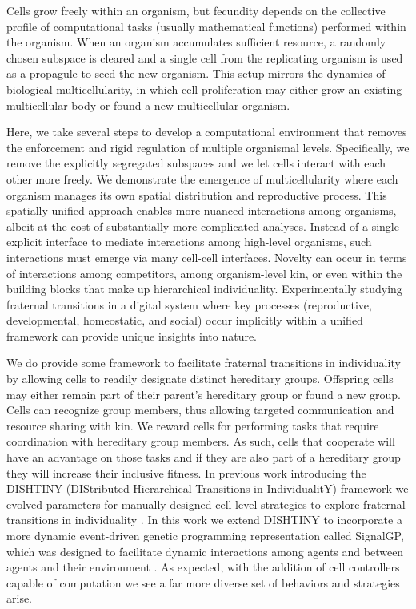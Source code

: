 Cells grow freely within an organism, but fecundity depends on the collective profile of computational tasks (usually mathematical functions) performed within the organism.
When an organism accumulates sufficient resource, a randomly chosen subspace is cleared and a single cell from the replicating organism is used as a propagule to seed the new organism.
This setup mirrors the dynamics of biological multicellularity, in which cell proliferation may either grow an existing multicellular body or found a new multicellular organism.

Here, we take several steps to develop a computational environment that removes the enforcement and rigid regulation of multiple organismal levels.
Specifically, we remove the explicitly segregated subspaces and we let cells interact with each other more freely.
We demonstrate the emergence of multicellularity where each organism manages its own spatial distribution and reproductive process.
This spatially unified approach enables more nuanced interactions among organisms, albeit at the cost of substantially more complicated analyses.
Instead of a single explicit interface to mediate interactions among high-level organisms, such interactions must emerge via many cell-cell interfaces.
Novelty can occur in terms of interactions among competitors, among organism-level kin, or even within the building blocks that make up hierarchical individuality.
Experimentally studying fraternal transitions in a digital system where key processes (reproductive, developmental, homeostatic, and social) occur implicitly within a unified framework can provide unique insights into nature.

We do provide some framework to facilitate fraternal transitions in individuality by allowing cells to readily designate distinct hereditary groups.
Offspring cells may either remain part of their parent's hereditary group or found a new group.
Cells can recognize group members, thus allowing targeted communication and resource sharing with kin.
We reward cells for performing tasks that require coordination with hereditary group members.
As such, cells that cooperate will have an advantage on those tasks and if they are also part of a hereditary group they will increase their inclusive fitness.
In previous work introducing the DISHTINY (DIStributed Hierarchical Transitions in IndividualitY) framework we evolved parameters for manually designed cell-level strategies to explore fraternal transitions in individuality \citep{moreno2019toward}.
In this work we extend DISHTINY to incorporate a more dynamic event-driven genetic programming representation called SignalGP, which was designed to facilitate dynamic interactions among agents and between agents and their environment \citep{lalejini2018evolving}.
As expected, with the addition of cell controllers capable of computation we see a far more diverse set of behaviors and strategies arise.

